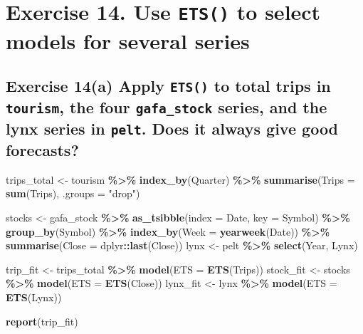 \documentclass[
  11pt,
]{article}
\newenvironment{Shaded}{\begin{snugshade}}{\end{snugshade}}
\newcommand{\AttributeTok}[1]{\textcolor[rgb]{0.13,0.29,0.53}{#1}}
\newcommand{\FunctionTok}[1]{\textcolor[rgb]{0.13,0.29,0.53}{\textbf{#1}}}
\newcommand{\NormalTok}[1]{#1}
\newcommand{\OtherTok}[1]{\textcolor[rgb]{0.56,0.35,0.01}{#1}}
\newcommand{\SpecialCharTok}[1]{\textcolor[rgb]{0.81,0.36,0.00}{\textbf{#1}}}
\newcommand{\StringTok}[1]{\textcolor[rgb]{0.31,0.60,0.02}{#1}}
\begin{document}
\section{\texorpdfstring{Exercise 14. Use \texttt{ETS()} to select
models for several
series}{Exercise 14. Use ETS() to select models for several series}}\label{exercise-14.-use-ets-to-select-models-for-several-series}

\subsection{\texorpdfstring{Exercise 14(a) Apply \texttt{ETS()} to total
trips in \texttt{tourism}, the four \texttt{gafa\_stock} series, and the
lynx series in \texttt{pelt}. Does it always give good
forecasts?}{Exercise 14(a) Apply ETS() to total trips in tourism, the four gafa\_stock series, and the lynx series in pelt. Does it always give good forecasts?}}\label{exercise-14a-apply-ets-to-total-trips-in-tourism-the-four-gafa_stock-series-and-the-lynx-series-in-pelt.-does-it-always-give-good-forecasts}

\begin{Shaded}
\begin{Highlighting}[]
\NormalTok{trips\_total }\OtherTok{\textless{}{-}}\NormalTok{ tourism }\SpecialCharTok{\%\textgreater{}\%}
  \FunctionTok{index\_by}\NormalTok{(Quarter) }\SpecialCharTok{\%\textgreater{}\%}
  \FunctionTok{summarise}\NormalTok{(}\AttributeTok{Trips =} \FunctionTok{sum}\NormalTok{(Trips), }\AttributeTok{.groups =} \StringTok{"drop"}\NormalTok{)}

\NormalTok{stocks }\OtherTok{\textless{}{-}}\NormalTok{ gafa\_stock }\SpecialCharTok{\%\textgreater{}\%}
  \FunctionTok{as\_tsibble}\NormalTok{(}\AttributeTok{index =}\NormalTok{ Date, }\AttributeTok{key =}\NormalTok{ Symbol) }\SpecialCharTok{\%\textgreater{}\%}
  \FunctionTok{group\_by}\NormalTok{(Symbol) }\SpecialCharTok{\%\textgreater{}\%}
  \FunctionTok{index\_by}\NormalTok{(}\AttributeTok{Week =} \FunctionTok{yearweek}\NormalTok{(Date)) }\SpecialCharTok{\%\textgreater{}\%}
  \FunctionTok{summarise}\NormalTok{(}\AttributeTok{Close =}\NormalTok{ dplyr}\SpecialCharTok{::}\FunctionTok{last}\NormalTok{(Close))}
\NormalTok{lynx }\OtherTok{\textless{}{-}}\NormalTok{ pelt }\SpecialCharTok{\%\textgreater{}\%} \FunctionTok{select}\NormalTok{(Year, Lynx)}

\NormalTok{trip\_fit }\OtherTok{\textless{}{-}}\NormalTok{ trips\_total }\SpecialCharTok{\%\textgreater{}\%} \FunctionTok{model}\NormalTok{(}\AttributeTok{ETS =} \FunctionTok{ETS}\NormalTok{(Trips))}
\NormalTok{stock\_fit }\OtherTok{\textless{}{-}}\NormalTok{ stocks }\SpecialCharTok{\%\textgreater{}\%} \FunctionTok{model}\NormalTok{(}\AttributeTok{ETS =} \FunctionTok{ETS}\NormalTok{(Close))}
\NormalTok{lynx\_fit }\OtherTok{\textless{}{-}}\NormalTok{ lynx }\SpecialCharTok{\%\textgreater{}\%} \FunctionTok{model}\NormalTok{(}\AttributeTok{ETS =} \FunctionTok{ETS}\NormalTok{(Lynx))}

\FunctionTok{report}\NormalTok{(trip\_fit)}
\end{Highlighting}
\end{Shaded}
\end{document}

